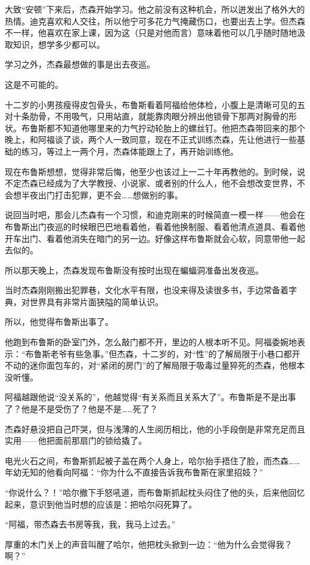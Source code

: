 \documentclass[../main]{subfiles}
\begin{document}
大致“安顿”下来后，杰森开始学习。他之前没有这种机会，所以迸发出了格外大的热情。迪克喜欢和人交往，所以他宁可多花力气掩藏伤口，也要出去上学。但杰森不一样，他喜欢在家上课，因为这（只是对他而言）意味着他可以几乎随时随地汲取知识，想学多少都可以。

学习之外，杰森最想做的事是出去夜巡。

这是不可能的。

十二岁的小男孩瘦得皮包骨头，布鲁斯看着阿福给他体检，小腹上是清晰可见的五对十条肋骨，不用吸气，只用站直，就能靠肉眼分辨出他锁骨下那两对胸骨的形状。布鲁斯都不知道他哪里来的力气拧动轮胎上的螺丝钉。他把杰森带回来的那个晚上，和阿福谈了谈，两个人一致同意，现在不正式训练杰森，先让他进行一些基础的练习，等过上一两个月，杰森体能跟上了，再开始训练他。

现在布鲁斯想想，觉得非常后悔，他至少也该过上一二十年再教他的。到时候，说不定杰森已经成为了大学教授、小说家、或者别的什么人，他不会想改变世界，不会想半夜出门打击犯罪，更不会……想做别的事。

说回当时吧，那会儿杰森有一个习惯，和迪克刚来的时候简直一模一样——他会在布鲁斯出门夜巡的时候眼巴巴地看着他，看着他换制服、看着他清点道具、看着他开车出门、看着他消失在暗门的另一边。好像这样布鲁斯就会心软，同意带他一起去似的。

所以那天晚上，杰森发现布鲁斯没有按时出现在蝙蝠洞准备出发夜巡。

当时杰森刚刚搬出犯罪巷，文化水平有限，也没来得及读很多书，手边常备着字典，对世界具有非常片面狭隘的简单认识。

所以，他觉得布鲁斯出事了。

他跑到布鲁斯的卧室门外，怎么敲门都不开，里边的人根本听不见。阿福委婉地表示：“布鲁斯老爷有些急事。”但杰森，十二岁的，对“性”的了解局限于小巷口都开不动的迷你面包车的，对“紧闭的房门”的了解局限于吸毒过量猝死的杰森，他根本没听懂。

阿福越跟他说“没关系的”，他越觉得“有关系而且关系大了”。布鲁斯是不是出事了？他是不是受伤了？他是不是……死了？

杰森好悬没把自己吓哭，但与浅薄的人生阅历相比，他的小手段倒是非常充足而且实用——他把面前那扇门的锁给撬了。

电光火石之间，布鲁斯抓起被子盖在两个人身上，哈尔抬手捂住了脸，而杰森……年幼无知的他看向阿福：“你为什么不直接告诉我布鲁斯在家里招妓？”

“你说什么？！”哈尔撤下手怒吼道，而布鲁斯抓起枕头闷住了他的头，后来他回忆起来，意识到他当时想的应该是：把哈尔闷死算了。

“阿福，带杰森去书房等我，我，我马上过去。”

厚重的木门关上的声音叫醒了哈尔，他把枕头掀到一边：“他为什么会觉得我？啊？”
\end{document}
